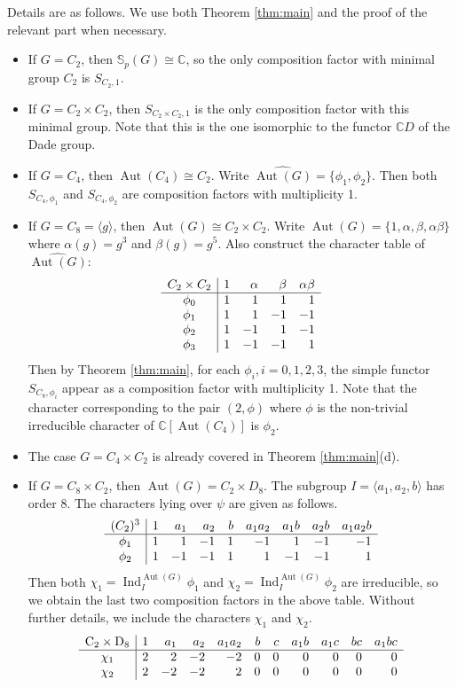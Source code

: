 \documentclass[12pt]{article}
\theoremstyle{plain}
\theoremstyle{definition}
\newcommand{\kerlin}{\mathbb S_p}
\newcommand{\ind}{\operatorname{Ind}}
\newcommand{\Aut}{\operatorname{Aut}}
\begin{document}
    Details are as follows. We use both Theorem \ref{thm:main} and the proof of the relevant part when necessary.
    \begin{itemize}
        \item If $G=C_2$, then $\kerlin(G) \cong \mathbb C$, so the only composition factor with minimal group $C_2$ is $S_{C_2, 1}$.
        \item If $G=C_2\times C_2$, then $S_{C_2\times C_2, 1}$ is the only composition factor with this minimal group. Note that this is the one isomorphic to the functor $\mathbb CD$ of the Dade group.
        \item If $G=C_4$, then $\Aut(C_4)\cong C_2$. Write $\widehat{\Aut(G)} = \{\phi_1, \phi_2\}$. Then both $S_{C_4, \phi_1}$ and $S_{C_4, \phi_2}$ are composition factors with multiplicity 1.
        \item If $G=C_8=\langle g\rangle$, then $\Aut(G)\cong C_2\times C_2$. Write $\Aut(G) = \{ 1, \alpha, \beta, \alpha\beta \}$ where $\alpha(g) = g^3$ and $\beta(g) = g^5$. 
        Also construct the character table of $\widehat{\Aut(G)}$:
        $$
\begin{array}{c|rrrr}
  C_2\times C_2&\rm1&\alpha&\beta&\alpha\beta\cr
\hline
  \phi_{0}&1&1&1&1\cr
  \phi_{1}&1&1&-1&-1\cr
  \phi_{2}&1&-1&1&-1\cr
  \phi_{3}&1&-1&-1&1\cr
\end{array}
$$
Then by Theorem \ref{thm:main}, for each $\phi_i, i=0, 1, 2, 3$, the simple functor $S_{C_8, \phi_i}$ appear as a composition factor with multiplicity 1. Note that the character corresponding to the pair $(2, \phi)$ where $\phi$ is the non-trivial irreducible character of $\mathbb C[\Aut(C_4)]$ is $\phi_2$.

\item The case $G = C_4\times C_2$ is already covered in Theorem \ref{thm:main}(d). 
\item If $G=C_8\times C_2$, then $\Aut(G) = C_2\times D_8$. The subgroup $I =\langle a_1, a_2, b\rangle$ has order 8. The characters lying over $\psi$ are given as follows.
$$
\begin{array}{c|rrrrrrrr}
  (C_2)^3&\rm1&a_1&a_2&b&a_1a_2&a_1b&a_2b&a_1a_2b\cr
\hline
  \phi_{1}&1&1&-1&1&-1&1&-1&-1\cr
  \phi_{2}&1&-1&-1&1&1&-1&-1&1\cr
\end{array}
$$
Then both $\chi_1=\ind_I^{\Aut(G)}\phi_1$ and $\chi_2=\ind_I^{\Aut(G)}\phi_2$ are irreducible, so we obtain the last two composition factors in the above table. Without further details, we include the characters $\chi_1$ and $\chi_2$.
$$
\begin{array}{c|rrrrrrrrrr}
  \rm C_2\times D_8&\rm1&a_1&a_2&a_1a_2&b&c&a_1b&a_1c&bc&a_1bc\cr
\hline
  \chi_{1}&2&2&-2&-2&0&0&0&0&0&0\cr
  \chi_{2}  &2&-2&-2&2&0&0&0&0&0&0\cr
\end{array}
$$
    \end{itemize}
\end{document}
